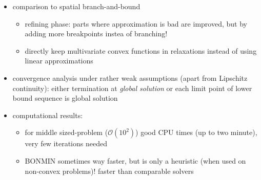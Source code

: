 \documentclass{article}
\begin{document}
\begin{itemize}
\item comparison to spatial branch-and-bound
	\begin{itemize}
	\item refining phase: parts where approximation is bad are improved, but by adding more breakpoints instea of branching!
	\item directly keep multivariate convex functions in relaxations instead of using linear approximations
	\end{itemize}
\item convergence analysis under rather weak assumptions (apart from Lipschitz continuity): either termination at \emph{global solution} or each limit point of lower bound sequence is global solution
\item computational results: 
	\begin{itemize}
	\item for middle sized-problem ($\mathcal{O}(10^2)$) good CPU times (up to two minute), very few iterations needed
	\item BONMIN sometimes way faster, but is only a heuristic (when used on non-convex problems)! faster than comparable solvers
\end{itemize}	 
\end{itemize}
\end{document}
